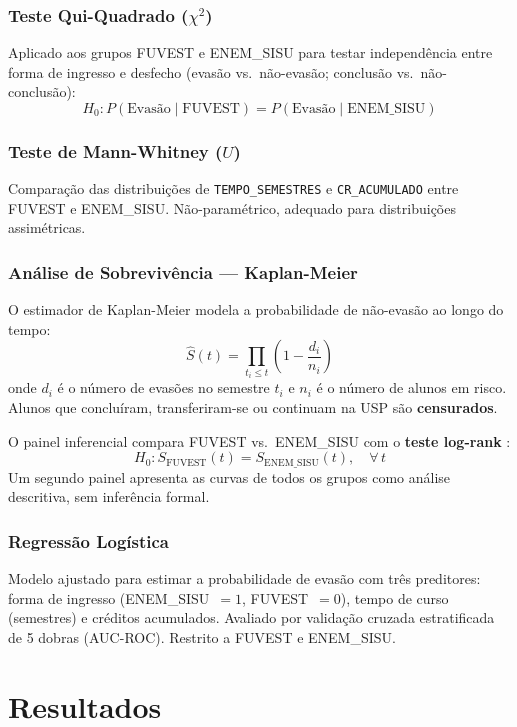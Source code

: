 \documentclass[12pt, a4paper]{article}
\begin{document}
\subsubsection{Teste Qui-Quadrado ($\chi^2$)}
Aplicado aos grupos FUVEST e ENEM\_SISU para testar independência entre
forma de ingresso e desfecho (evasão vs.\ não-evasão; conclusão vs.\
não-conclusão):
\[
  H_0: P(\text{Evasão} \mid \text{FUVEST}) = P(\text{Evasão} \mid \text{ENEM\_SISU})
\]

\subsubsection{Teste de Mann-Whitney ($U$)}
Comparação das distribuições de \texttt{TEMPO\_SEMESTRES} e
\texttt{CR\_ACUMULADO} entre FUVEST e ENEM\_SISU. Não-paramétrico, adequado
para distribuições assimétricas.

\subsubsection{Análise de Sobrevivência --- Kaplan-Meier}
O estimador de Kaplan-Meier \citep{kaplan1958} modela a probabilidade de
não-evasão ao longo do tempo:
\[
  \hat{S}(t) = \prod_{t_i \leq t} \left(1 - \frac{d_i}{n_i}\right)
\]
onde $d_i$ é o número de evasões no semestre $t_i$ e $n_i$ é o número de
alunos em risco. Alunos que concluíram, transferiram-se ou continuam na USP
são \textbf{censurados}.

O painel inferencial compara FUVEST vs.\ ENEM\_SISU com o \textbf{teste
log-rank} \citep{mantel1966}:
\[
  H_0: S_{\text{FUVEST}}(t) = S_{\text{ENEM\_SISU}}(t), \quad \forall\, t
\]
Um segundo painel apresenta as curvas de todos os grupos como análise
descritiva, sem inferência formal.

\subsubsection{Regressão Logística}
Modelo ajustado para estimar a probabilidade de evasão com três preditores:
forma de ingresso (ENEM\_SISU~$= 1$, FUVEST~$= 0$), tempo de curso
(semestres) e créditos acumulados. Avaliado por validação cruzada
estratificada de 5 dobras (AUC-ROC). Restrito a FUVEST e ENEM\_SISU.

\section{Resultados}
\end{document}
